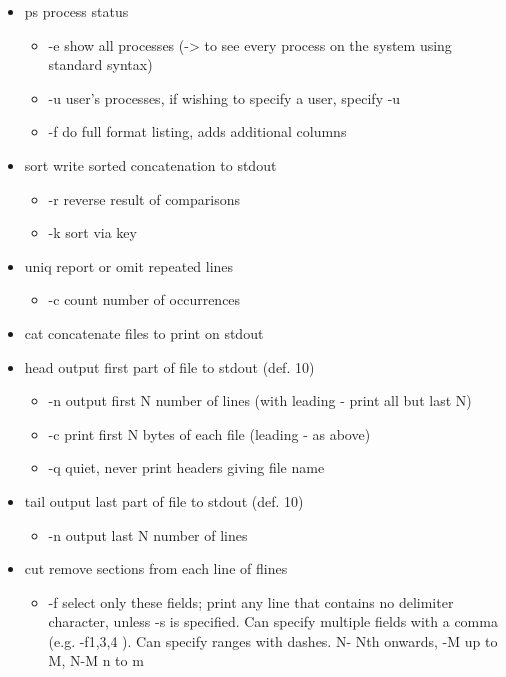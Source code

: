 \documentclass[10pt, a4paper]{article}
\begin{document}
\begin{multicols}{4}
\begin{itemize}
\begin{itemize}
        \end{itemize}
        \item ps  process status
        \begin{itemize}
        \item  -e  show all processes (-> to see every process on the system using standard syntax) 
        \item  -u  user's processes, if wishing to specify a user, specify -u  
        \item  -f  do full format listing, adds additional columns 
        \end{itemize}
        \item sort  write sorted concatenation to stdout
        \begin{itemize}
        \item  -r  reverse result of comparisons 
        \item  -k  sort via key 
        \end{itemize}
        \item uniq  report or omit repeated lines
        \begin{itemize}
        \item  -c  count number of occurrences
        \end{itemize}
        \item cat  concatenate files to print on stdout
        \item head  output first part of file to stdout (def. 10)
        \begin{itemize}
        \item  -n  output first N number of lines (with leading - print all but last N) 
        \item  -c  print first N bytes of each file (leading - as above)
        \item  -q  quiet, never print headers giving file name
        \end{itemize}
        \item tail  output last part of file to stdout (def. 10)
        \begin{itemize}
        \item  -n  output last N number of lines 
        \end{itemize}
        \item cut  remove sections from each line of flines
        \begin{itemize}
        \item  -f  select only these fields; print any line that contains no delimiter character, unless -s is specified. Can specify multiple fields with a comma (e.g. -f1,3,4 ). Can specify ranges with dashes. N- Nth onwards, -M up to M, N-M n to m

\end{itemize}
\end{itemize}
\end{multicols}
\end{document}
